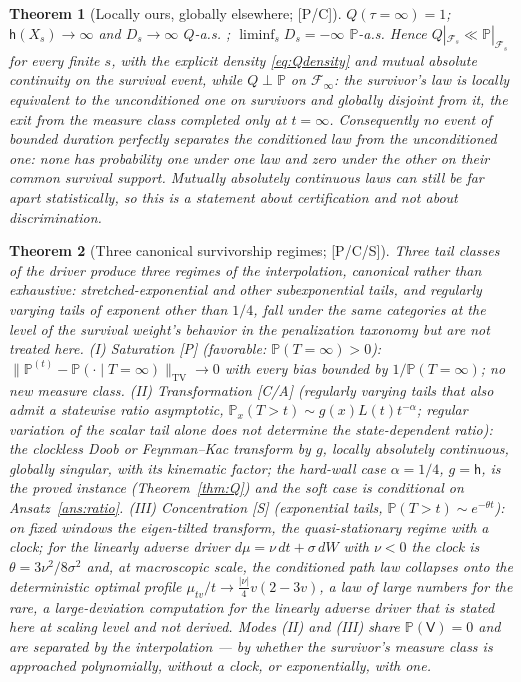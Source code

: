\documentclass[11pt]{article}
\newtheorem{theorem}{Theorem}[section]
\theoremstyle{definition}
\theoremstyle{remark}
\newcommand{\PP}{\mathbb{P}}
\newcommand{\hm}{\mathsf{h}}
\newcommand{\Fc}{\mathcal{F}}
\newcommand{\Imm}{\mathsf{V}}
\begin{document}
\begin{theorem}[Locally ours, globally elsewhere; {[P/C]}]
\label{thm:singular}
$Q(\tau=\infty)=1$; $\hm(X_s)\to\infty$ and $D_s\to\infty$ $Q$-a.s.
\cite{GJW99}; $\liminf_sD_s=-\infty$ $\PP$-a.s. Hence
$Q|_{\Fc_s}\ll\PP|_{\Fc_s}$ for every finite $s$, with the explicit
density \eqref{eq:Qdensity} and mutual absolute continuity on the
survival event, while $Q\perp\PP$ on $\Fc_\infty$: the survivor's
law is locally equivalent to the unconditioned one on survivors and
globally disjoint from it, the exit from the measure class completed
only at $t=\infty$. Consequently no event of bounded duration perfectly separates the
conditioned law from the unconditioned one: none has probability one
under one law and zero under the other on their common survival
support. Mutually absolutely continuous laws can still be far apart
statistically, so this is a statement about certification and not
about discrimination.
\end{theorem}

\begin{theorem}[Three canonical survivorship regimes; {[P/C/S]}]
\label{thm:modes}
Three tail classes of the driver produce three regimes of the
interpolation, canonical rather than exhaustive: stretched-exponential
and other subexponential tails, and regularly varying tails of
exponent other than $1/4$, fall under the same categories at the
level of the survival weight's behavior in the penalization taxonomy
but are not treated here. \emph{(I) Saturation} [P] (favorable:
$\PP(T=\infty)>0$): $\|\PP^{(t)}-\PP(\cdot\mid
T=\infty)\|_{\mathrm{TV}}\to0$ with every bias bounded by
$1/\PP(T=\infty)$; no new measure class. \emph{(II) Transformation}
[C/A] (regularly varying tails that also admit a statewise ratio
asymptotic, $\PP_x(T>t)\sim g(x)L(t)t^{-\alpha}$; regular variation of
the scalar tail alone does not determine the state-dependent ratio):
the clockless Doob or Feynman--Kac transform by $g$, locally absolutely
continuous, globally singular, with its kinematic factor; the hard-wall
case $\alpha=1/4$, $g=\hm$, is the proved instance
(Theorem~\ref{thm:Q}) and the soft case is conditional on
Ansatz~\ref{ans:ratio}. \emph{(III) Concentration} [S]
(exponential tails, $\PP(T>t)\sim e^{-\theta t}$): on fixed windows
the eigen-tilted transform, the quasi-stationary regime with a clock;
for the linearly adverse driver $d\mu=\nu\,dt+\sigma\,dW$ with
$\nu<0$ the clock is $\theta=3\nu^2/8\sigma^2$ and, at macroscopic
scale, the conditioned path law collapses onto the deterministic
optimal profile $\mu_{tv}/t\to\tfrac{|\nu|}4v(2-3v)$, a law of large
numbers for the rare, a large-deviation computation for the linearly
adverse driver that is stated here at scaling level and not derived. Modes (II) and (III) share $\PP(\Imm)=0$ and are separated by
the interpolation --- by whether the survivor's measure class is
approached polynomially, without a clock, or exponentially, with one.
\end{theorem}
\end{document}
